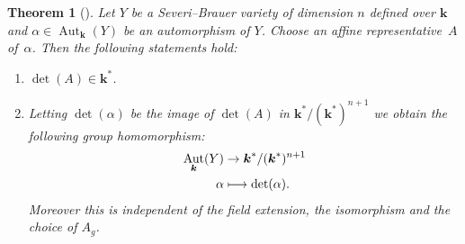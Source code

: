 \documentclass[10pt,a4paper]{amsart}
\newcommand\mto{\mathchoice{\longmapsto}{\mapsto}{\mapsto}{\mapsto}}
\newtheorem{theorem}{Theorem}[section]
\theoremstyle{definition}
\newcommand{\kk}{{\boldsymbol{k}}}
\DeclareMathOperator{\Aut}{Aut}
\begin{document}
\begin{theorem}[\cite{BSYUnp}] \label{Determinant}
Let $Y$ be a Severi--Brauer variety of dimension $n$ defined over $\kk$ and $\alpha \in \Aut_{\kk}(Y)$ be an automorphism of $Y$. Choose an affine representative~$A$ of~$\alpha$. Then the following statements hold:
\begin{enumerate}
\item $\det(A) \in \kk^*$.
\item Letting $\det(\alpha)$ be the image of $\det(A)$ in $\kk^* / (\kk^*)^{n + 1}$ we obtain the following group homomorphism:
\begin{align*}
\Aut_{\kk}(Y) &\to \kk^*/(\kk^*)^{n + 1}
\\
\alpha &\mto \det(\alpha).
\end{align*}
Moreover this is independent of the field extension, the isomorphism and the choice of $A_g$.
\end{enumerate}
\end{theorem}
\end{document}

